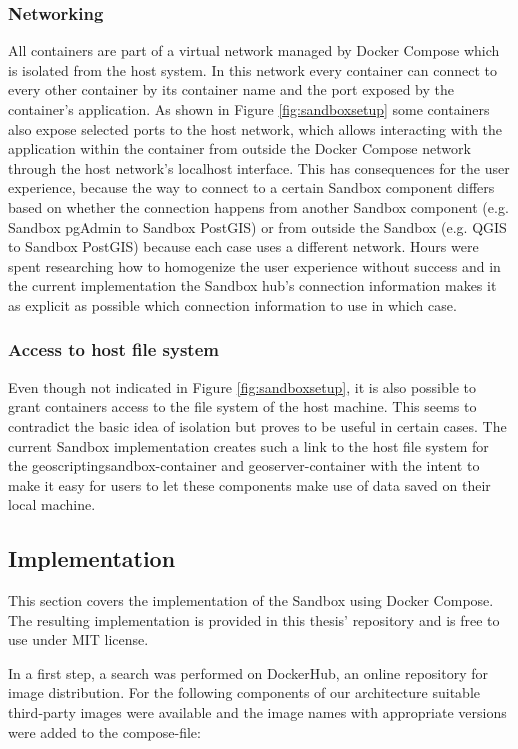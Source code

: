 \documentclass[11pt, a4paper, oneside, parskip=full-]{scrartcl}
\begin{document}
\subsubsection*{Networking}
All containers are part of a virtual network managed by Docker Compose which is
isolated from the host system. In this network every container can connect to
every other container by its container name and the port exposed by the
container's application. As shown in Figure \ref{fig:sandboxsetup} some
containers also expose selected ports to the host network, which allows
interacting with the application within the container from outside the Docker
Compose network through the host network's localhost interface. This has
consequences for the user experience, because the way to connect to a certain
Sandbox component differs based on whether the connection happens from another
Sandbox component (e.g. Sandbox pgAdmin to Sandbox PostGIS) or from outside the
Sandbox (e.g. QGIS to Sandbox PostGIS) because each case uses a different
network. Hours were spent researching how to homogenize the user experience
without success and in the current implementation the Sandbox hub's connection
information makes it as explicit as possible which connection information to use
in which case.

\subsubsection*{Access to host file system}
Even though not indicated in Figure \ref{fig:sandboxsetup}, it is also possible
to grant containers access to the file system of the host machine. This seems to
contradict the basic idea of isolation but proves to be useful in certain cases.
The current Sandbox implementation creates such a link to the host file system
for the geoscriptingsandbox-container and geoserver-container with the intent to
make it easy for users to let these components make use of data saved on their
local machine.

\subsection{Implementation}

This section covers the implementation of the Sandbox using Docker Compose. The
resulting implementation is provided in this thesis'
repository\cite{osgeostacksandbox} and is free to use under MIT license.

In a first step, a search was performed on DockerHub\cite{dockerhub}, an online
repository for image distribution. For the following components of our
architecture suitable third-party images were available and the image names with
appropriate versions were added to the compose-file:
\end{document}
